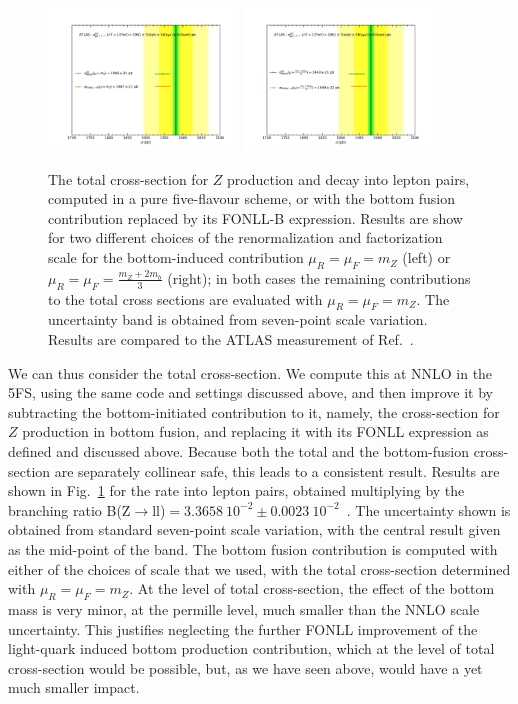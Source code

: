 \documentclass[12pt]{article}
\begin{document}
\begin{figure}
  \begin{center}
    \includegraphics[width=0.45\textwidth]{tot_xs_mz.pdf}
    \includegraphics[width=0.45\textwidth]{tot_xsmzmb.pdf} 
    \caption{\label{fig:ztotal}
The total cross-section for $Z$ production and decay into lepton
pairs, 
computed in a pure
five-flavour scheme, or with the bottom fusion contribution replaced
by its FONLL-B expression. Results are show for two different choices
of the renormalization and factorization scale  for the bottom-induced
contribution $\mu_R=\mu_F=m_Z$ (left) or
$\mu_R=\mu_F=\frac{m_Z+2m_b}{3}$ (right); in both cases the remaining
contributions to the total cross sections are evaluated with
$\mu_R=\mu_F=m_Z$. The uncertainty band is obtained from seven-point
scale variation.
 Results are compared to the ATLAS measurement of
Ref.~\cite{Aad:2016naf}. }
  \end{center}
\end{figure}
%
We can thus consider the total cross-section. We compute this 
at NNLO in
the 5FS, using the same code and settings discussed above, and then
improve it by  subtracting
the bottom-initiated contribution to it, namely, the cross-section for
$Z$ production in bottom fusion, and  
replacing it with its FONLL expression as defined and discussed
above. Because both the total and the bottom-fusion cross-section are
separately collinear safe, this leads to a consistent result.
Results are shown in Fig.~\ref{fig:ztotal} for the rate into
lepton pairs, obtained multiplying by the branching ratio
B(Z$\to$ll)$=3.3658~10^{-2}\pm 0.0023~10^{-2}$~\cite{Tanabashi:2018oca}.
The uncertainty shown is
obtained from standard seven-point scale variation, with the central
result given as the mid-point of the band.  The bottom fusion
contribution is computed with either of the choices of scale that we
used, with the total cross-section determined with $\mu_R=\mu_F=m_Z$. 
At the level of total cross-section, the effect of the
bottom mass is very minor, at the permille level, much smaller
than the NNLO scale uncertainty. This justifies neglecting the further
FONLL improvement of the light-quark induced bottom production
contribution, which at the level of total cross-section would be
possible, but, as we have seen above, would have a yet much smaller
impact. 
\end{document}
